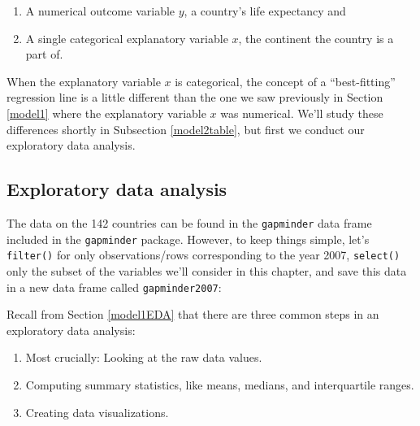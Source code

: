 \documentclass[12pt, krantz2,]{krantz}
\makeatletter
\newenvironment{Shaded}{\begin{snugshade}}{\end{snugshade}}
\newcommand{\DecValTok}[1]{\textcolor[rgb]{0.06,0.06,0.06}{#1}}
\newcommand{\KeywordTok}[1]{\textcolor[rgb]{0.27,0.27,0.27}{\textbf{#1}}}
\newcommand{\NormalTok}[1]{#1}
\newcommand{\OperatorTok}[1]{\textcolor[rgb]{0.43,0.43,0.43}{\textbf{#1}}}
\newcommand{\StringTok}[1]{\textcolor[rgb]{0.5,0.5,0.5}{#1}}
\providecommand{\tightlist}{%
  \setlength{\itemsep}{0pt}\setlength{\parskip}{0pt}}
\newenvironment{kframe}{%
\medskip{}
\setlength{\fboxsep}{.8em}
 \def\at@end@of@kframe{}%
 \ifinner\ifhmode%
  \def\at@end@of@kframe{\end{minipage}}%
  \begin{minipage}{\columnwidth}%
 \fi\fi%
 \def\FrameCommand##1{\hskip\@totalleftmargin \hskip-\fboxsep
 \colorbox{shadecolor}{##1}\hskip-\fboxsep
     \hskip-\linewidth \hskip-\@totalleftmargin \hskip\columnwidth}%
 \MakeFramed {\advance\hsize-\width
   \@totalleftmargin\z@ \linewidth\hsize
   \@setminipage}}%
 {\par\unskip\endMakeFramed%
 \at@end@of@kframe}
\renewenvironment{Shaded}{\begin{kframe}}{\end{kframe}}
\makeatother
\begin{document}
\begin{enumerate}
\def\labelenumi{\arabic{enumi}.}
\tightlist
\item
  A numerical outcome variable \(y\), a country's life expectancy and
\item
  A single categorical explanatory variable \(x\), the continent the country is a part of.
\end{enumerate}

When the explanatory variable \(x\) is categorical, the concept of a ``best-fitting'' regression line is a little different than the one we saw previously in Section \ref{model1} where the explanatory variable \(x\) was numerical. We'll study these differences shortly in Subsection \ref{model2table}, but first we conduct our exploratory data analysis.

\hypertarget{model2EDA}{%
\subsection{Exploratory data analysis}\label{model2EDA}}

The data on the 142 countries can be found in the \texttt{gapminder} data frame included in the \texttt{gapminder} package. However, to keep things simple, let's \texttt{filter()} for only observations/rows corresponding to the year 2007, \texttt{select()} only the subset of the variables we'll consider in this chapter, and save this data in a new data frame called \texttt{gapminder2007}:

\begin{Shaded}
\end{Shaded}

Recall from Section \ref{model1EDA} that there are three common steps in an exploratory data analysis:

\begin{enumerate}
\def\labelenumi{\arabic{enumi}.}
\tightlist
\item
  Most crucially: Looking at the raw data values.
\item
  Computing summary statistics, like means, medians, and interquartile ranges.
\item
  Creating data visualizations.
\end{enumerate}
\end{document}
